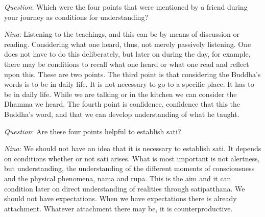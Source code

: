 \textit{Question}: Which were the four points that were mentioned by a friend during your journey as conditions for understanding?



\textit{Nina}: Listening to the teachings, and this can be by means of discussion or reading. Considering what one heard, thus, not merely passively listening. One does not have to do this deliberately, but later on during the day, for example, there may be conditions to recall what one heard or what one read and reflect upon this. These are two points. The third point is that considering the Buddha’s words is to be in daily life. It is not necessary to go to a specific place. It has to be in daily life. While we are talking or in the kitchen we can consider the Dhamma we heard. The fourth point is confidence, confidence that this the Buddha’s word, and that we can develop understanding of what he taught. 


\textit{Question}: Are these four points helpful to establish sati?



\textit{Nina}: We should not have an idea that it is necessary to establish sati. It depends on conditions whether or not sati arises. What is most important is not alertness, but understanding, the understanding of the different moments of consciousness and the physical phenomena, nama and rupa. This is the aim and it can condition later on direct understanding of realities through satipatthana. We should not have expectations. When we have expectations there is already attachment. Whatever attachment there may be, it is counterproductive. 


